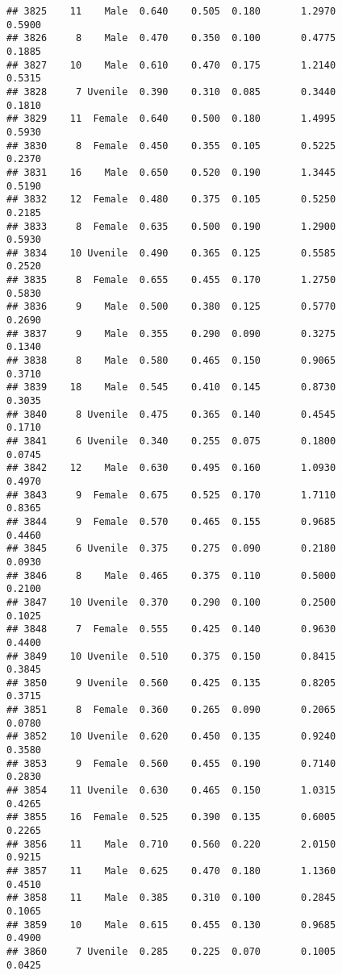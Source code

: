 \documentclass[
]{article}
\begin{document}
\begin{verbatim}
## 3825    11    Male  0.640    0.505  0.180       1.2970         0.5900
## 3826     8    Male  0.470    0.350  0.100       0.4775         0.1885
## 3827    10    Male  0.610    0.470  0.175       1.2140         0.5315
## 3828     7 Uvenile  0.390    0.310  0.085       0.3440         0.1810
## 3829    11  Female  0.640    0.500  0.180       1.4995         0.5930
## 3830     8  Female  0.450    0.355  0.105       0.5225         0.2370
## 3831    16    Male  0.650    0.520  0.190       1.3445         0.5190
## 3832    12  Female  0.480    0.375  0.105       0.5250         0.2185
## 3833     8  Female  0.635    0.500  0.190       1.2900         0.5930
## 3834    10 Uvenile  0.490    0.365  0.125       0.5585         0.2520
## 3835     8  Female  0.655    0.455  0.170       1.2750         0.5830
## 3836     9    Male  0.500    0.380  0.125       0.5770         0.2690
## 3837     9    Male  0.355    0.290  0.090       0.3275         0.1340
## 3838     8    Male  0.580    0.465  0.150       0.9065         0.3710
## 3839    18    Male  0.545    0.410  0.145       0.8730         0.3035
## 3840     8 Uvenile  0.475    0.365  0.140       0.4545         0.1710
## 3841     6 Uvenile  0.340    0.255  0.075       0.1800         0.0745
## 3842    12    Male  0.630    0.495  0.160       1.0930         0.4970
## 3843     9  Female  0.675    0.525  0.170       1.7110         0.8365
## 3844     9  Female  0.570    0.465  0.155       0.9685         0.4460
## 3845     6 Uvenile  0.375    0.275  0.090       0.2180         0.0930
## 3846     8    Male  0.465    0.375  0.110       0.5000         0.2100
## 3847    10 Uvenile  0.370    0.290  0.100       0.2500         0.1025
## 3848     7  Female  0.555    0.425  0.140       0.9630         0.4400
## 3849    10 Uvenile  0.510    0.375  0.150       0.8415         0.3845
## 3850     9 Uvenile  0.560    0.425  0.135       0.8205         0.3715
## 3851     8  Female  0.360    0.265  0.090       0.2065         0.0780
## 3852    10 Uvenile  0.620    0.450  0.135       0.9240         0.3580
## 3853     9  Female  0.560    0.455  0.190       0.7140         0.2830
## 3854    11 Uvenile  0.630    0.465  0.150       1.0315         0.4265
## 3855    16  Female  0.525    0.390  0.135       0.6005         0.2265
## 3856    11    Male  0.710    0.560  0.220       2.0150         0.9215
## 3857    11    Male  0.625    0.470  0.180       1.1360         0.4510
## 3858    11    Male  0.385    0.310  0.100       0.2845         0.1065
## 3859    10    Male  0.615    0.455  0.130       0.9685         0.4900
## 3860     7 Uvenile  0.285    0.225  0.070       0.1005         0.0425

\end{verbatim}
\end{document}

